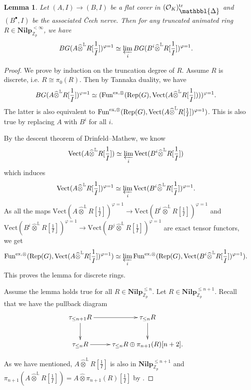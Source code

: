 \documentclass[10pt]{article}
\newtheorem{lem}[thm]{Lemma}
\numberwithin{equation}{section}
\newcommand{\bL}{{\mathbb L}}
\newcommand{\bZ}{{\mathbb Z}}
\newcommand{\calO}{{\mathcal O}}
\newcommand{\Rep}{{\mathrm{Rep}}}           %
\newcommand{\Vect}{{\mathrm{Vect}}}         %
\newcommand{\Prism}{{\mathlarger{\mathbbl{\Delta}}}} %
\newcommand{\Fun}{\mathrm{Fun}}
\begin{document}
\begin{lem}\label{flat descent}
   Let $(A,I)\to (B,I)$ be a flat cover in $(\calO_K)_{\Prism}^{\rm tr}$ and $(B^{\bullet},I)$ be the associated \v Cech nerve. Then for any truncated animated ring $R\in \textbf{Nilp}^{<\infty}_{\bZ_p}$, we have
   \[
   BG(A\widehat\otimes^{\bL}R[\frac{1}{I}])^{\varphi=1}\simeq \varprojlim_iBG(B^i\widehat\otimes^{\bL}R[\frac{1}{I}])^{\varphi=1}.
   \]
\end{lem}
\begin{proof}
    We prove by induction on the truncation degree of $R$. Assume $R$ is discrete, i.e. $R\cong \pi_0(R)$. Then by Tannaka duality, we have
    \[
    BG(A\widehat\otimes^{\bL}R[\frac{1}{I}])^{\varphi=1}\simeq (\Fun^{{\rm ex},\otimes}(\Rep(G),\Vect(A\widehat\otimes^{\bL}R[\frac{1}{I}])))^{\varphi=1}.
    \]
    The latter is also equivalent to $\Fun^{{\rm ex},\otimes}(\Rep(G),\Vect(A\widehat\otimes^{\bL}R[\frac{1}{I}])^{\varphi=1})$. This is also true by replacing $A$ with $B^i$ for all $i$.

    By the descent theorem \cite[Theorem 2.4]{Min23} of Drinfeld--Mathew, we know 
    \[
    \Vect(A\widehat\otimes^{\bL}R[\frac{1}{I}])\simeq \varprojlim_i\Vect(B^i\widehat\otimes^{\bL}R[\frac{1}{I}])
    \]
    which induces
    \[
    \Vect(A\widehat\otimes^{\bL}R[\frac{1}{I}])^{\varphi=1}\simeq \varprojlim_i\Vect(B^i\widehat\otimes^{\bL}R[\frac{1}{I}])^{\varphi=1}.
    \]
    As all the maps $ \Vect(A\widehat\otimes^{\bL}R[\frac{1}{I}])^{\varphi=1}\to  \Vect(B^i\widehat\otimes^{\bL}R[\frac{1}{I}])^{\varphi=1}$ and $ \Vect(B^i\widehat\otimes^{\bL}R[\frac{1}{I}])^{\varphi=1}\to  \Vect(B^j\widehat\otimes^{\bL}R[\frac{1}{I}])^{\varphi=1}$ are exact tensor functors, we get
    \[
    \Fun^{{\rm ex},\otimes}(\Rep(G),\Vect(A\widehat\otimes^{\bL}R[\frac{1}{I}])^{\varphi=1})\simeq\varprojlim_i\Fun^{{\rm ex},\otimes}(\Rep(G),\Vect(B^i\widehat\otimes^{\bL}R[\frac{1}{I}])^{\varphi=1}).
    \]
    This proves the lemma for discrete rings.

    Assume the lemma holds true for all $R\in \textbf{Nilp}_{\bZ_p}^{\leq n}$. Let $R\in\textbf{Nilp}_{\bZ_p}^{\leq n+1}$. Recall that we have the pullback diagram
    \begin{equation}\label{truncation}
        \xymatrix{
        \tau_{\leq {n+1}}R\ar[r]\ar[d]&\tau_{\leq n}R\ar[d]\\
        \tau_{\leq n}R\ar[r]&\tau_{\leq n}R\oplus \pi_{n+1}(R)[n+2].
        }
    \end{equation}

    As we have mentioned, $A\widehat\otimes^{\bL}R[\frac{1}{I}]$ is also in $\textbf{Nilp}_{\bZ_p}^{\leq n+1}$ and $\pi_{n+1}(A\widehat\otimes^{\bL}R[\frac{1}{I}])=A\widehat\otimes\pi_{n+1}(R)[\frac{1}{I}]$ by \cite[Lemma 3.28]{Min23}.
    


\end{proof}
\end{document}
